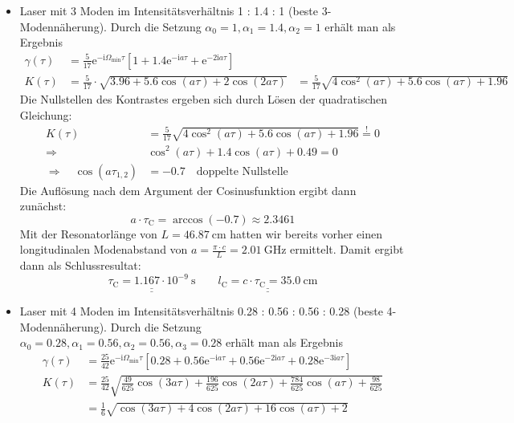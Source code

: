 \documentclass[german,  %
parskip=full,  %
]{scrartcl}
\begin{document}
\begin{itemize}
\item Laser mit 3 Moden im Intensitätsverhältnis 1 : 1.4 : 1 (beste 3-Modennäherung). Durch die Setzung \(\alpha_0 = 1,\alpha_1 = 1.4, \alpha_2 = 1\) erhält man als Ergebnis
\begin{align*}
\gamma(\tau) &= \frac{5}{17}\mathrm{e}^{-\mathrm{i}\Omega_{\mathrm{min}}\tau} \left[1 + 1.4\mathrm{e}^{-\mathrm{i}a\tau} + \mathrm{e}^{-2\mathrm{i}a\tau}\right] \\
K(\tau) &= \frac{5}{17}\cdot\sqrt{3.96 + 5.6\cos(a\tau) + 2\cos(2a\tau)}
&= \frac{5}{17}\sqrt{4\cos^2(a\tau) + 5.6\cos(a\tau) + 1.96}
\end{align*}
Die Nullstellen des Kontrastes ergeben sich durch Lösen der quadratischen Gleichung:
\begin{align*}
K(\tau) &= \frac{5}{17}\sqrt{4\cos^2(a\tau) + 5.6\cos(a\tau) + 1.96} \overset{!}{=} 0 \\
\Longrightarrow\quad  &\cos^2(a\tau) + 1.4\cos(a\tau) + 0.49 = 0 \\
\Longrightarrow\quad \cos(a\tau_{1,2}) &= -0.7 \quad\text{doppelte Nullstelle}
\end{align*}
Die Auflösung nach dem Argument der Cosinusfunktion ergibt dann zunächst:
\[a\cdot\tau_{\mathrm{C}} = \arccos(-0.7) \approx 2.3461\]
Mit der Resonatorlänge von \(L = 46.87 \ \mathrm{cm}\) hatten wir bereits vorher einen longitudinalen Modenabstand von \(a = \frac{\pi\cdot c}{L} = 2.01 \ \mathrm{GHz}\) ermittelt. Damit ergibt dann als Schlussresultat:
\[\underline{\underline{\tau_{\mathrm{C}} = 1.167\cdot 10^{-9} \ \mathrm{s}}} \quad \quad \underline{\underline{l_{\mathrm{C}} = c\cdot\tau_{\mathrm{C}} = 35.0 \ \mathrm{cm}}}\]
\item Laser mit 4 Moden im Intensitätsverhältnis 0.28 : 0.56 : 0.56 : 0.28 (beste 4-Modennäherung). Durch die Setzung \(\alpha_0 = 0.28,\alpha_1 = 0.56, \alpha_2 = 0.56, \alpha_3 = 0.28\) erhält man als Ergebnis
\begin{align*}
\gamma(\tau) &= \frac{25}{42}\mathrm{e}^{-\mathrm{i}\Omega_{\mathrm{min}}\tau} \left[0.28 + 0.56\mathrm{e}^{-\mathrm{i}a\tau} + 0.56\mathrm{e}^{-2\mathrm{i}a\tau} + 0.28 \mathrm{e}^{-3\mathrm{i}a\tau}\right] \\
K(\tau) &= \frac{25}{42}\sqrt{\frac{49}{625}\cos(3a\tau) + \frac{196}{625}\cos(2a\tau) + \frac{784}{625}\cos(a\tau) + \frac{98}{625}} \\
&= \frac{1}{6}\sqrt{\cos(3a\tau) + 4\cos(2a\tau) + 16\cos(a\tau) + 2} \\

\end{align*}
\end{itemize}
\end{document}
